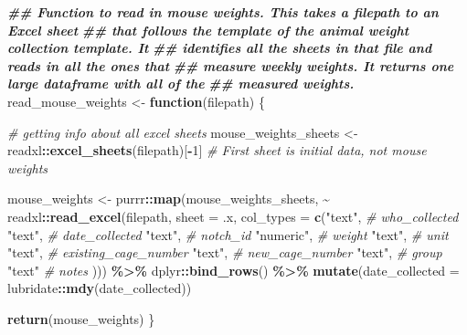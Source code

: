 \documentclass[
]{book}
\newenvironment{Shaded}{\begin{snugshade}}{\end{snugshade}}
\newcommand{\AttributeTok}[1]{\textcolor[rgb]{0.13,0.29,0.53}{#1}}
\newcommand{\CommentTok}[1]{\textcolor[rgb]{0.56,0.35,0.01}{\textit{#1}}}
\newcommand{\ControlFlowTok}[1]{\textcolor[rgb]{0.13,0.29,0.53}{\textbf{#1}}}
\newcommand{\DecValTok}[1]{\textcolor[rgb]{0.00,0.00,0.81}{#1}}
\newcommand{\DocumentationTok}[1]{\textcolor[rgb]{0.56,0.35,0.01}{\textbf{\textit{#1}}}}
\newcommand{\FunctionTok}[1]{\textcolor[rgb]{0.13,0.29,0.53}{\textbf{#1}}}
\newcommand{\NormalTok}[1]{#1}
\newcommand{\OtherTok}[1]{\textcolor[rgb]{0.56,0.35,0.01}{#1}}
\newcommand{\SpecialCharTok}[1]{\textcolor[rgb]{0.81,0.36,0.00}{\textbf{#1}}}
\newcommand{\StringTok}[1]{\textcolor[rgb]{0.31,0.60,0.02}{#1}}
\begin{document}
\begin{Shaded}
\begin{Highlighting}[]
\DocumentationTok{\#\# Function to read in mouse weights. This takes a filepath to an Excel sheet}
\DocumentationTok{\#\# that follows the template of the animal weight collection template. It }
\DocumentationTok{\#\# identifies all the sheets in that file and reads in all the ones that }
\DocumentationTok{\#\# measure weekly weights. It returns one large dataframe with all of the }
\DocumentationTok{\#\# measured weights. }
\NormalTok{read\_mouse\_weights }\OtherTok{\textless{}{-}} \ControlFlowTok{function}\NormalTok{(filepath) \{}
  
  \CommentTok{\# getting info about all excel sheets}
\NormalTok{  mouse\_weights\_sheets }\OtherTok{\textless{}{-}}\NormalTok{ readxl}\SpecialCharTok{::}\FunctionTok{excel\_sheets}\NormalTok{(filepath)[}\SpecialCharTok{{-}}\DecValTok{1}\NormalTok{] }\CommentTok{\# First sheet is initial data, not mouse weights}
  
\NormalTok{  mouse\_weights }\OtherTok{\textless{}{-}}\NormalTok{ purrr}\SpecialCharTok{::}\FunctionTok{map}\NormalTok{(mouse\_weights\_sheets, }
                              \SpecialCharTok{\textasciitilde{}}\NormalTok{ readxl}\SpecialCharTok{::}\FunctionTok{read\_excel}\NormalTok{(filepath, }\AttributeTok{sheet =}\NormalTok{ .x, }
                                                   \AttributeTok{col\_types =} \FunctionTok{c}\NormalTok{(}\StringTok{"text"}\NormalTok{,   }\CommentTok{\# who\_collected}
                                                                 \StringTok{"text"}\NormalTok{,   }\CommentTok{\# date\_collected}
                                                                 \StringTok{"text"}\NormalTok{,   }\CommentTok{\# notch\_id}
                                                                 \StringTok{"numeric"}\NormalTok{, }\CommentTok{\# weight}
                                                                 \StringTok{"text"}\NormalTok{,   }\CommentTok{\# unit}
                                                                 \StringTok{"text"}\NormalTok{,   }\CommentTok{\# existing\_cage\_number}
                                                                 \StringTok{"text"}\NormalTok{,   }\CommentTok{\# new\_cage\_number}
                                                                 \StringTok{"text"}\NormalTok{,   }\CommentTok{\# group}
                                                                 \StringTok{"text"}    \CommentTok{\# notes}
\NormalTok{                                                                 ))) }\SpecialCharTok{\%\textgreater{}\%} 
\NormalTok{    dplyr}\SpecialCharTok{::}\FunctionTok{bind\_rows}\NormalTok{() }\SpecialCharTok{\%\textgreater{}\%} 
    \FunctionTok{mutate}\NormalTok{(}\AttributeTok{date\_collected =}\NormalTok{ lubridate}\SpecialCharTok{::}\FunctionTok{mdy}\NormalTok{(date\_collected))}

  \FunctionTok{return}\NormalTok{(mouse\_weights)}
\NormalTok{\}}
\end{Highlighting}
\end{Shaded}
\end{document}
